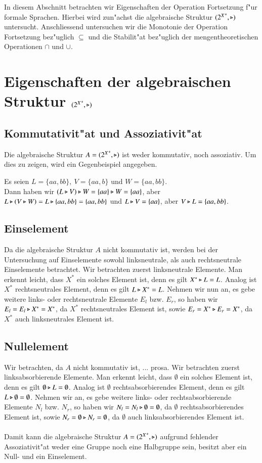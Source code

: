 In diesem Abschnitt betrachten wir Eigenschaften der Operation Fortsetzung f"ur formale Sprachen.
Hierbei wird zun"achst die algebraische Struktur $({2^X}^*,\triangleright)$ untersucht. Anschliessend untersuchen wir die Monotonie der Operation Fortsetzung bez"uglich $\subseteq$ und die Stabilit"at bez"uglich der mengentheoretischen Operationen $\cap$ und $\cup$.

\section{Eigenschaften der algebraischen Struktur $({2^X}^*,\triangleright)$}

\subsection{Kommutativit"at und Assoziativit"at}
Die algebraische Struktur $A=({2^X}^*,\triangleright)$ ist weder kommutativ, noch assoziativ. Um dies zu zeigen, wird ein Gegenbeispiel angegeben.
\begin{beispiel}
Es seien $L=\{aa,bb\},\ V = \{aa,b\}$ und $W=\{aa,bb\}$. \\Dann haben wir $(L\triangleright V)\triangleright W = \{aa\} \triangleright W = \{aa\}$, aber $L\triangleright (V\triangleright W) = L\triangleright \{aa,bb\} = \{aa,bb\}$ und $L\triangleright V = \{aa\}$, aber $V\triangleright L=\{aa,bb\}$.
\end{beispiel}
\subsection{Einselement}
Da die algebraische Struktur $A$ nicht kommutativ ist, werden bei der Untersuchung auf Einselemente sowohl linksneutrale, als auch rechtsneutrale Einselemente betrachtet.
Wir betrachten zuerst linksneutrale Elemente.
Man erkennt leicht, dass $X^*$ ein solches Element ist, denn es gilt $X^*\triangleright L = L$.
Analog ist $X^*$ rechtsneutrales Element, denn es gilt $L\triangleright X^* = L$.
Nehmen wir nun an, es gebe weitere links- oder rechtsneutrale Elemente $E_l$ bzw. $E_r$, so haben wir $E_l=E_l\triangleright X^* = X^*$, da $X^*$ rechtsneutrales Element ist, sowie $E_r = X^*\triangleright E_r = X^*$, da $X^*$ auch linksneutrales Element ist.
\subsection{Nullelement}
Wir betrachten, da $A$ nicht kommutativ ist, ... prosa.
Wir betrachten zuerst linksabsorbierende Elemente.
Man erkennt leicht, dass $\emptyset$ ein solches Element ist, denn es gilt $\emptyset\triangleright L = \emptyset$.
Analog ist $\emptyset$ rechtsabsorbierendes Element, denn es gilt $L\triangleright\emptyset =\emptyset$.
Nehmen wir an, es gebe weitere links- oder rechtsabsorbierende Elemente $N_l$ bzw. $N_r$, so haben wir $N_l = N_l\triangleright \emptyset = \emptyset$, da $\emptyset$ rechtsabsorbierendes Element ist, sowie $N_r = \emptyset\triangleright N_r = \emptyset$, da $\emptyset$ auch linksabsorbierendes Element ist.\\\\
Damit kann die algebraische Struktur $A=({2^X}^*,\triangleright)$ aufgrund fehlender Assoziativit"at weder eine Gruppe noch eine Halbgruppe sein, besitzt aber ein Null- und ein Einselement.


